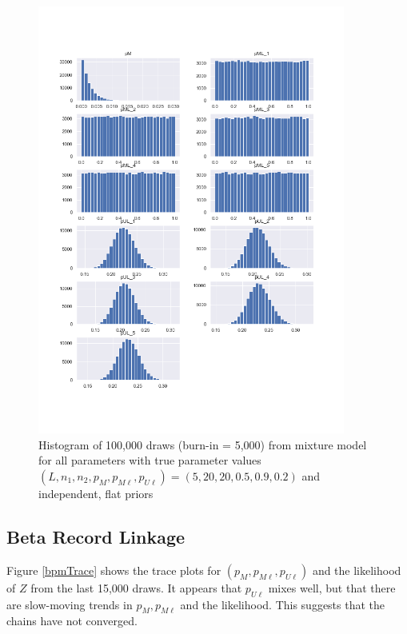 \documentclass[11pt,reqno]{amsart}
\newcommand\params{(p_M, p_{M\ell}, p_{U\ell})}
\begin{document}
\begin{figure}[h!]
\begin{center}
\includegraphics[width=0.9\textwidth]{../Figures/mm/nM10/allParam_nM10_L5.png}
\vspace{-40pt}
\caption{Histogram of 100,000 draws (burn-in = 5,000) from mixture model for all parameters with true parameter values $(L, n_1, n_2, p_M, p_{M\ell}, p_{U\ell}) = (5, 20, 20, 0.5, 0.9, 0.2)$ and independent, flat priors}
\label{mmLarge}
\end{center}
\end{figure}


\subsection{Beta Record Linkage}  Figure \ref{bpmTrace} shows the trace plots for $\params$ and the likelihood of $Z$ from the last 15,000 draws.  It appears that $p_{U\ell}$ mixes well, but that there are slow-moving trends in $p_M, p_{M\ell}$ and the likelihood.  This suggests that the chains have not converged. 
\end{document}
